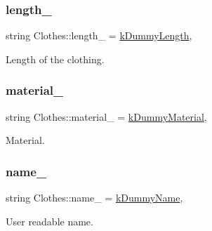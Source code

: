 \mbox{\label{classClothes_ae02603eda727e33caf46ec30e761e3c3}} 
\subsubsection{\texorpdfstring{length\+\_\+}{length\_}}
{\footnotesize\ttfamily string Clothes\+::length\+\_\+ = \mbox{\hyperlink{clothes_8h_a1624256dcecfb0995a74c36142593770}{k\+Dummy\+Length}}\hspace{0.3cm}{\ttfamily [protected]}, {\ttfamily [inherited]}}



Length of the clothing. 

\mbox{\label{classClothes_adbb9ed311f14ccbb1e4fe0e8378a95d4}} 
\subsubsection{\texorpdfstring{material\+\_\+}{material\_}}
{\footnotesize\ttfamily string Clothes\+::material\+\_\+ = \mbox{\hyperlink{clothes_8h_a9df1268c6668ae4e2a728ccf032cc33d}{k\+Dummy\+Material}}\hspace{0.3cm}{\ttfamily [protected]}, {\ttfamily [inherited]}}



Material. 

\mbox{\label{classClothes_a7f2275aaae24224d60c48af922c31b65}} 
\subsubsection{\texorpdfstring{name\+\_\+}{name\_}}
{\footnotesize\ttfamily string Clothes\+::name\+\_\+ = \mbox{\hyperlink{clothes_8h_adba739b5125fd5a4066ec0ef063c0657}{k\+Dummy\+Name}}\hspace{0.3cm}{\ttfamily [protected]}, {\ttfamily [inherited]}}



User readable name. 

\mbox{\label{classClothes_a1d40145a4eb6d28441f112f030ab5d35}} 
